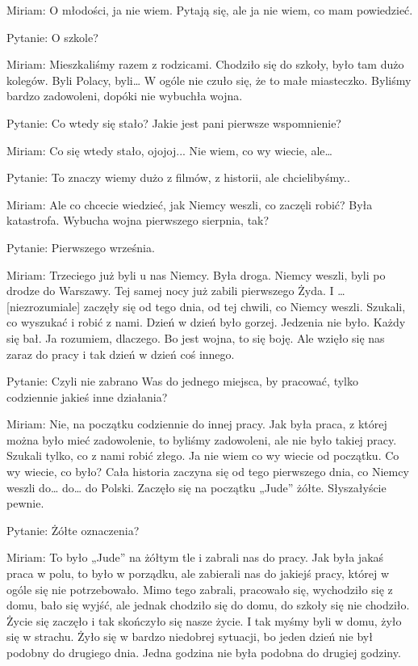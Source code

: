 Miriam: O młodości, ja nie wiem. Pytają się, ale ja nie wiem, co mam powiedzieć. 

 

Pytanie: O szkole? 

Miriam: Mieszkaliśmy razem z rodzicami. Chodziło się do szkoły, było tam dużo kolegów. Byli Polacy, byli… W ogóle nie czuło się, że to małe miasteczko. Byliśmy bardzo zadowoleni, dopóki nie wybuchła wojna. 

Pytanie: Co wtedy się stało? Jakie jest pani pierwsze wspomnienie? 

Miriam: Co się wtedy stało, ojojoj... Nie wiem, co wy wiecie, ale… 

Pytanie: To znaczy wiemy dużo z filmów, z historii, ale chcielibyśmy.. 

Miriam: Ale co chcecie wiedzieć, jak Niemcy weszli, co zaczęli robić? Była katastrofa. Wybucha wojna pierwszego sierpnia, tak? 

Pytanie: Pierwszego września. 

Miriam: Trzeciego już byli u nas Niemcy. Była droga. Niemcy weszli, byli po drodze do Warszawy. Tej samej nocy już zabili pierwszego Żyda. I … [niezrozumiale] zaczęły się od tego dnia, od tej chwili, co Niemcy weszli. Szukali, co wyszukać i robić z nami. Dzień w dzień było gorzej. Jedzenia nie było. Każdy się bał. Ja rozumiem, dlaczego. Bo jest wojna, to się boję. Ale wzięło się nas zaraz do pracy i tak dzień w dzień coś innego. 

 

Pytanie: Czyli nie zabrano Was do jednego miejsca, by pracować, tylko codziennie jakieś inne działania? 

Miriam: Nie, na początku codziennie do innej pracy. Jak była praca, z której można było mieć zadowolenie, to byliśmy zadowoleni, ale nie było takiej pracy. Szukali tylko, co z nami robić złego. Ja nie wiem co wy wiecie od początku. Co wy wiecie, co było? Cała historia zaczyna się od tego pierwszego dnia, co Niemcy weszli do… do… do Polski. Zaczęło się na początku „Jude” żółte. Słyszałyście pewnie. 

 

Pytanie: Żółte oznaczenia? 

Miriam: To było „Jude” na żółtym tle i zabrali nas do pracy. Jak była jakaś praca w polu, to było w porządku, ale zabierali nas do jakiejś pracy, której w ogóle się nie potrzebowało. Mimo tego zabrali, pracowało się, wychodziło się z domu, bało się wyjść, ale jednak chodziło się do domu, do szkoły się nie chodziło. Życie się zaczęło i tak skończyło się nasze życie. I tak myśmy byli w domu, żyło się w strachu. Żyło się w bardzo niedobrej sytuacji, bo jeden dzień nie był podobny do drugiego dnia. Jedna godzina nie była podobna do drugiej godziny. 

